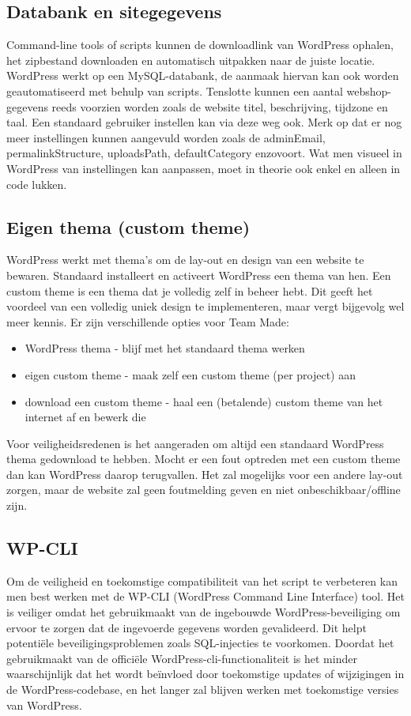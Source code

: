 \subsection{Databank en sitegegevens}
Command-line tools of scripts kunnen de downloadlink van WordPress ophalen, het zipbestand downloaden en automatisch uitpakken naar de juiste locatie. WordPress werkt op een MySQL-databank, de aanmaak hiervan kan ook worden geautomatiseerd met behulp van scripts. Tenslotte kunnen een aantal webshop-gegevens reeds voorzien worden zoals de website titel, beschrijving, tijdzone en taal. Een standaard gebruiker instellen kan via deze weg ook. Merk op dat er nog meer instellingen kunnen aangevuld worden zoals de adminEmail, permalinkStructure, uploadsPath, defaultCategory enzovoort. Wat men visueel in WordPress van instellingen kan aanpassen, moet in theorie ook enkel en alleen in code lukken.
\subsection{Eigen thema (custom theme)}
WordPress werkt met thema's om de lay-out en design van een website te bewaren. Standaard installeert en activeert WordPress een thema van hen. Een custom theme is een thema dat je volledig zelf in beheer hebt. Dit geeft het voordeel van een volledig uniek design te implementeren, maar vergt bijgevolg wel meer kennis. Er zijn verschillende opties voor Team Made:
\begin{itemize}
    \item WordPress thema - blijf met het standaard thema werken
    \item eigen custom theme - maak zelf een custom theme (per project) aan
    \item download een custom theme - haal een (betalende) custom theme van het internet af en bewerk die
\end{itemize}
Voor veiligheidsredenen is het aangeraden om altijd een standaard WordPress thema gedownload te hebben. Mocht er een fout optreden met een custom theme dan kan WordPress daarop terugvallen. Het zal mogelijks voor een andere lay-out zorgen, maar de website zal geen foutmelding geven en niet onbeschikbaar/offline zijn. 
\subsection{WP-CLI}
Om de veiligheid en toekomstige compatibiliteit van het script te verbeteren kan men best werken met de WP-CLI (WordPress Command Line Interface) tool. Het is veiliger omdat het gebruikmaakt van de ingebouwde WordPress-beveiliging om ervoor te zorgen dat de ingevoerde gegevens worden gevalideerd. Dit helpt potentiële beveiligingsproblemen zoals SQL-injecties te voorkomen. Doordat het gebruikmaakt van de officiële WordPress-cli-functionaliteit is het minder waarschijnlijk dat het wordt beïnvloed door toekomstige updates of wijzigingen in de WordPress-codebase, en het langer zal blijven werken met toekomstige versies van WordPress.
\\\\
